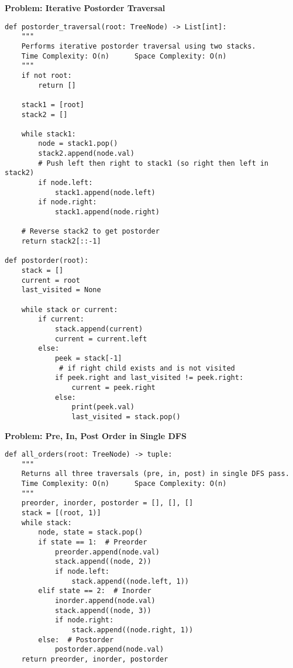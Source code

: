 \noindent\textbf{Problem: Iterative Postorder Traversal}
\begin{verbatim}
def postorder_traversal(root: TreeNode) -> List[int]:
    """
    Performs iterative postorder traversal using two stacks.
    Time Complexity: O(n)      Space Complexity: O(n)
    """
    if not root:
        return []
    
    stack1 = [root]
    stack2 = []
    
    while stack1:
        node = stack1.pop()
        stack2.append(node.val)
        # Push left then right to stack1 (so right then left in stack2)
        if node.left:
            stack1.append(node.left)
        if node.right:
            stack1.append(node.right)
    
    # Reverse stack2 to get postorder
    return stack2[::-1]
    
def postorder(root):
    stack = []
    current = root
    last_visited = None
    
    while stack or current:
        if current:
            stack.append(current)
            current = current.left
        else:
            peek = stack[-1]
             # if right child exists and is not visited
            if peek.right and last_visited != peek.right:
                current = peek.right
            else:
                print(peek.val)
                last_visited = stack.pop()

\end{verbatim}
\noindent\textbf{Problem: Pre, In, Post Order in Single DFS}
\begin{verbatim}
def all_orders(root: TreeNode) -> tuple:
    """
    Returns all three traversals (pre, in, post) in single DFS pass.
    Time Complexity: O(n)      Space Complexity: O(n)
    """
    preorder, inorder, postorder = [], [], []
    stack = [(root, 1)]
    while stack:
        node, state = stack.pop()
        if state == 1:  # Preorder
            preorder.append(node.val)
            stack.append((node, 2))
            if node.left:
                stack.append((node.left, 1))
        elif state == 2:  # Inorder
            inorder.append(node.val)
            stack.append((node, 3))
            if node.right:
                stack.append((node.right, 1))
        else:  # Postorder
            postorder.append(node.val)
    return preorder, inorder, postorder
\end{verbatim}
